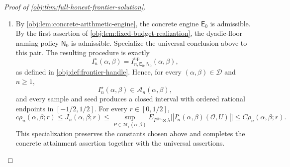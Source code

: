 \documentclass[11pt]{article}
\begin{document}
\begin{proof}[Proof of \cref{obj:thm:full-honest-frontier-solution}]
\begin{enumerate}
\item By \cref{obj:lem:concrete-arithmetic-engine}, the concrete engine
\(\mathsf E_0\) is admissible. By the first assertion of
\cref{obj:lem:fixed-budget-realization}, the dyadic-floor naming policy
\(\mathsf N_0\) is admissible. Specialize the universal conclusion above
to this pair. The resulting procedure is exactly
\[
I_n^\star(\alpha,\beta)
=
I^{\mathrm{up}}_{n,\mathsf E_0,\mathsf N_0}(\alpha,\beta),
\]
as defined in \cref{obj:def:frontier-handle}. Hence, for every
\((\alpha,\beta)\in\mathcal D\) and \(n\ge1\),
\[
I_n^\star(\alpha,\beta)\in\mathcal A_n(\alpha,\beta),
\]
and every sample and seed produces a closed interval with ordered
rational endpoints in \([-1/2,1/2]\). For every \(r\in[0,1/2]\),
\[
c\rho_n(\alpha,\beta;r)
\le J_n(\alpha,\beta;r)
\le
\sup_{P\in\mathcal M_r(\alpha,\beta)}
E_{P^{\otimes n}\otimes\lambda}
\bigl[|I_n^\star(\alpha,\beta)(\mathcal O,U)|\bigr]
\le C\rho_n(\alpha,\beta;r).
\]
This specialization preserves the constants chosen above and completes
the concrete attainment assertion together with the universal assertions.
\end{enumerate}
\end{proof}




\end{document}
